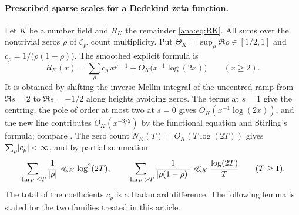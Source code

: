\paragraph{Prescribed sparse scales for a Dedekind zeta function.}
Let $K$ be a number field and $R_K$ the remainder \eqref{ana:eq:RK}. All sums over the
nontrivial zeros $\rho$ of $\zeta_K$ count multiplicity. Put
$\Theta_K=\sup_\rho\Re\rho\in[1/2,1]$ and $c_\rho=1/\bigl(\rho(1-\rho)\bigr)$. The smoothed
explicit formula is
\begin{equation}\label{ana:eq:explicit}
 R_K(x)=\sum_\rho c_\rho\,x^{\rho-1}+O_K\bigl(x^{-1}\log(2x)\bigr)\qquad(x\ge2).
\end{equation}
It is obtained by shifting the inverse Mellin integral of the uncentred ramp from $\Re s=2$
to $\Re s=-1/2$ along heights avoiding zeros. The terms at $s=1$ give the centring, the pole
of order at most two at $s=0$ gives $O_K(x^{-1}\log(2x))$, and the new line contributes
$O_K(x^{-3/2})$ by the functional equation and Stirling's formula; compare
\cite[\S\S1.2--1.3]{IharaEulerKronecker}. The zero count $N_K(T)=O_K(T\log(2T))$ gives
$\sum_\rho\lvert c_\rho\rvert<\infty$, and by partial summation
\begin{equation}\label{ana:eq:zerosums}
 \sum_{\lvert\operatorname{Im}\rho\rvert\le T}\frac1{\lvert\rho\rvert}\ll_K\log^2(2T),\qquad
 \sum_{\lvert\operatorname{Im}\rho\rvert>T}\frac1{\lvert\rho(1-\rho)\rvert}\ll_K\frac{\log(2T)}T\qquad(T\ge1).
\end{equation}
The total of the coefficients $c_\rho$ is a Hadamard difference. The following lemma is stated
for the two families treated in this article.

